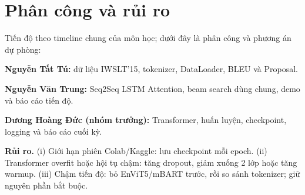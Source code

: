 \documentclass[11pt,a4paper]{article}
\begin{document}
\section{Phân công và rủi ro}

Tiến độ theo timeline chung của môn học; dưới đây là
phân công và phương án dự phòng:

\noindent\textbf{Nguyễn Tất Tú:} dữ liệu IWSLT'15, tokenizer,
DataLoader, BLEU và Proposal.

\noindent\textbf{Nguyễn Văn Trung:} Seq2Seq LSTM Attention, beam search dùng chung,
demo và báo cáo tiến độ.

\noindent\textbf{Dương Hoàng Đức (nhóm trưởng):} Transformer, huấn luyện,
checkpoint, logging và báo cáo cuối kỳ.

\textbf{Rủi ro.}
(i) Giới hạn phiên Colab/Kaggle: lưu checkpoint mỗi epoch. (ii) Transformer overfit hoặc hội tụ chậm: tăng dropout, giảm xuống 2 lớp hoặc tăng warmup. (iii) Chậm tiến độ: bỏ EnViT5/mBART trước, rồi so sánh tokenizer; giữ nguyên phần bắt buộc.

\begingroup
\small
\setlength{\bibsep}{1pt}


\endgroup
\end{document}
